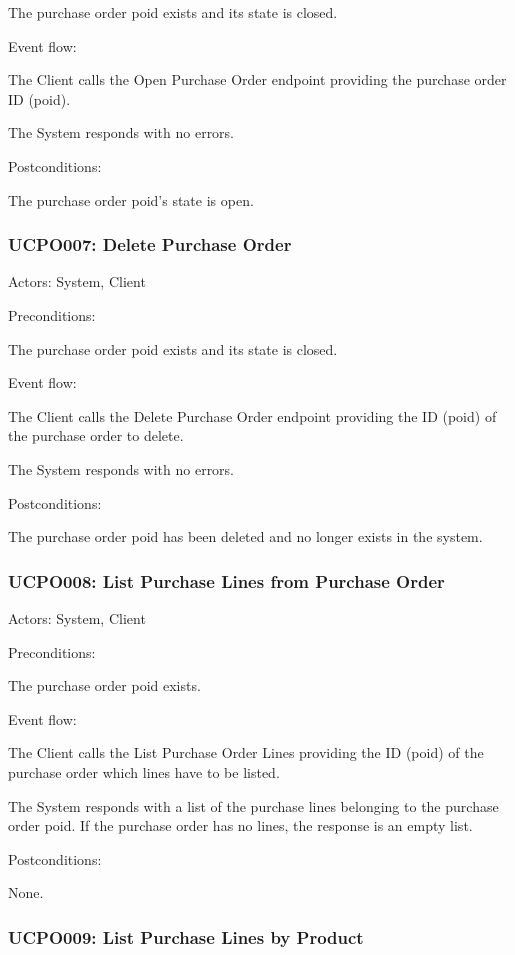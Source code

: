 \ucitem The purchase order poid exists and its state is closed.

Event flow:

\ucitem The Client calls the Open Purchase Order endpoint providing the purchase order ID (poid).

\ucitem The System responds with no errors.

Postconditions:

\ucitem The purchase order poid’s state is open.

\subsubsection{UCPO007: Delete Purchase Order}
\label{UCPO007}

Actors: System, Client

Preconditions:

\ucitem The purchase order poid exists and its state is closed.

Event flow:

\ucitem The Client calls the Delete Purchase Order endpoint providing the ID (poid) of the purchase order to delete.

\ucitem The System responds with no errors.

Postconditions:

\ucitem The purchase order poid has been deleted and no longer exists in the system.

\subsubsection{UCPO008: List Purchase Lines from Purchase Order}
\label{UCPO008}

Actors: System, Client

Preconditions:

\ucitem The purchase order poid exists.

Event flow:

\ucitem The Client calls the List Purchase Order Lines providing the ID (poid) of the purchase order which lines have to be listed.

\ucitem The System responds with a list of the purchase lines belonging to the purchase order poid. If the purchase order has no lines, the response is an empty list.

Postconditions: 

\ucitem None.

\subsubsection{UCPO009: List Purchase Lines by Product}
\label{UCPO009}

